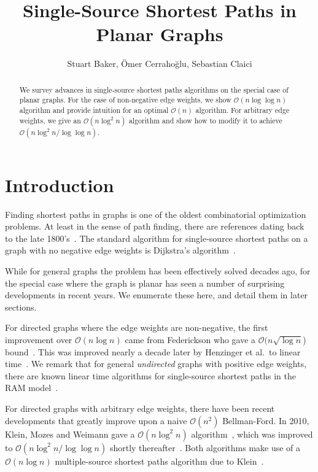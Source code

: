 \documentclass[11pt]{article}
\title{Single-Source Shortest Paths in Planar Graphs}
\author{Stuart Baker, \"{O}mer Cerraho\u{g}lu, Sebastian Claici}
\date{}
\begin{document}
\maketitle

\begin{abstract}
  We survey advances in single-source shortest paths algorithms on the special case of planar graphs. For the case of non-negative edge weights, we show $\mathcal{O}(n\log \log n)$ algorithm and provide intuition for an optimal $\mathcal{O}(n)$ algorithm. For arbitrary edge weights, we give an $\mathcal{O}(n\log^2 n)$ algorithm and show how to modify it to achieve $\mathcal{O}(n\log^2 n/\log \log n)$.
\end{abstract}

\section{Introduction}
\label{sec:introduction}

Finding shortest paths in graphs is one of the oldest combinatorial optimization problems. At least in the sense of path finding, there are references dating back to the late 1800's~\cite{wiener1873ueber}. The standard algorithm for single-source shortest paths on a graph with no negative edge weights is Dijkstra's algorithm~\cite{dijkstra1959note}.

While for general graphs the problem has been effectively solved decades ago, for the special case where the graph is planar has seen a number of surprising developments in recent years. We enumerate these here, and detail them in later sections.

For directed graphs where the edge weights are non-negative, the first improvement over $\mathcal{O}(n\log n)$ came from Federickson who gave a $\mathcal{O}(n \sqrt{\log n}$) bound~\cite{federickson1987fast}. This was improved nearly a decade later by Henzinger et al.\ to linear time~\cite{henzinger1997faster}. We remark that for general \emph{undirected} graphs with positive edge weights, there are known linear time algorithms for single-source shortest paths in the RAM model~\cite{thorup1999undirected}.

For directed graphs with arbitrary edge weights, there have been recent developments that greatly improve upon a naive $\mathcal{O}(n^2)$ Bellman-Ford. In 2010, Klein, Mozes and Weimann gave a $\mathcal{O}(n \log^2 n)$ algorithm~\cite{klein2010shortest}, which was improved to $\mathcal{O}(n \log^2 n / \log \log n)$ shortly thereafter~\cite{mozes2010shortest}. Both algorithms make use of a $\mathcal{O}(n \log n)$ multiple-source shortest paths algorithm due to Klein~\cite{klein2005multiple}.
\end{document}
